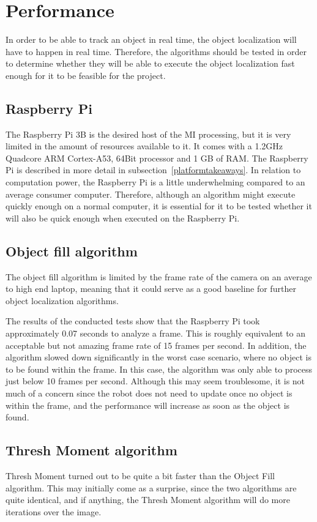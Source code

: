 \section{Performance}\label{des:sec:performance}
In order to be able to track an object in real time, the object localization will have to happen in real time.
Therefore, the algorithms should be tested in order to determine whether they will be able to execute the object localization fast enough for it to be feasible for the project.

\subsection{Raspberry Pi}
The Raspberry Pi 3B is the desired host of the MI processing, but it is very limited in the amount of resources available to it.
It comes with a 1.2GHz Quadcore ARM Cortex-A53, 64Bit processor and 1 GB of RAM.
The Raspberry Pi is described in more detail in subsection~\ref{platformtakeaways}.
In relation to computation power, the Raspberry Pi is a little underwhelming compared to an average consumer computer.
Therefore, although an algorithm might execute quickly enough on a normal computer, it is essential for it to be tested whether it will also be quick enough when executed on the Raspberry Pi.

\subsection{Object fill algorithm}
The object fill algorithm is limited by the frame rate of the camera on an average to high end laptop, meaning that it could serve as a good baseline for further object localization algorithms.

The results of the conducted tests show that the Raspberry Pi took approximately 0.07 seconds to analyze a frame.
This is roughly equivalent to an acceptable but not amazing frame rate of 15 frames per second.
In addition, the algorithm slowed down significantly in the worst case scenario, where no object is to be found within the frame.
In this case, the algorithm was only able to process just below 10 frames per second.
Although this may seem troublesome, it is not much of a concern since the robot does not need to update once no object is within the frame, and the performance will increase as soon as the object is found.

\subsection{Thresh Moment algorithm}
Thresh Moment turned out to be quite a bit faster than the Object Fill algorithm.
This may initially come as a surprise, since the two algorithms are quite identical, and if anything, the Thresh Moment algorithm will do more iterations over the image.

